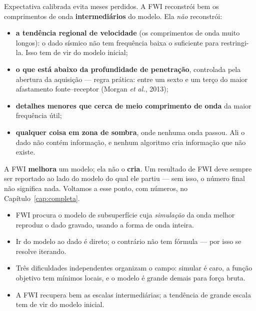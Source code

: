 \documentclass[11pt,a4paper,oneside]{report}
\begin{document}
Expectativa calibrada evita meses perdidos. A FWI reconstr\'oi bem os
comprimentos de onda \textbf{intermedi\'arios} do modelo. Ela
\emph{n\~ao} reconstr\'oi:

\begin{itemize}[leftmargin=*]
\item \textbf{a tend\^encia regional de velocidade} (os comprimentos de onda
muito longos): o dado s\'ismico n\~ao tem frequ\^encia baixa o suficiente para
restringi-la. Isso tem de vir do modelo inicial;
\item \textbf{o que est\'a abaixo da profundidade de penetra\c{c}\~ao},
controlada pela abertura da aquisi\c{c}\~ao --- regra pr\'atica: entre um
sexto e um ter\c{c}o do maior afastamento fonte--receptor (Morgan \emph{et
al.}, 2013);
\item \textbf{detalhes menores que cerca de meio comprimento de onda} da maior
frequ\^encia \'util;
\item \textbf{qualquer coisa em zona de sombra}, onde nenhuma onda passou. Ali
o dado n\~ao cont\'em informa\c{c}\~ao, e nenhum algoritmo cria
informa\c{c}\~ao que n\~ao existe.
\end{itemize}

\begin{atencao}
A FWI \textbf{melhora} um modelo; ela n\~ao o \textbf{cria}. Um resultado de
FWI deve sempre ser reportado ao lado do modelo do qual ele partiu --- sem
isso, o n\'umero final n\~ao significa nada. Voltamos a esse ponto, com
n\'umeros, no Cap\'itulo~\ref{cap:completa}.
\end{atencao}

\begin{resumo}
\begin{itemize}[leftmargin=*, itemsep=1pt]
\item FWI procura o modelo de subsuperf\'icie cuja \emph{simula\c{c}\~ao} da
onda melhor reproduz o dado gravado, usando a forma de onda inteira.
\item Ir do modelo ao dado \'e direto; o contr\'ario n\~ao tem f\'ormula ---
por isso se resolve iterando.
\item Tr\^es dificuldades independentes organizam o campo: simular \'e caro,
a fun\c{c}\~ao objetivo tem m\'inimos locais, e o modelo \'e grande demais
para for\c{c}a bruta.
\item A FWI recupera bem as escalas intermedi\'arias; a tend\^encia de grande
escala tem de vir do modelo inicial.
\end{itemize}
\end{resumo}
\end{document}
